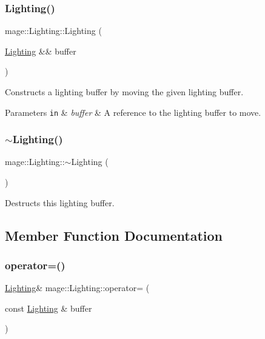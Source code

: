 \subsubsection{\texorpdfstring{Lighting()}{Lighting()}\hspace{0.1cm}{\footnotesize\ttfamily [3/3]}}
{\footnotesize\ttfamily mage\+::\+Lighting\+::\+Lighting (\begin{DoxyParamCaption}\item[{\hyperlink{structmage_1_1_lighting}{Lighting} \&\&}]{buffer }\end{DoxyParamCaption})\hspace{0.3cm}{\ttfamily [default]}}

Constructs a lighting buffer by moving the given lighting buffer.


\begin{DoxyParams}[1]{Parameters}
\mbox{\tt in}  & {\em buffer} & A reference to the lighting buffer to move. \\
\hline
\end{DoxyParams}
\hypertarget{structmage_1_1_lighting_a2b357cb6853d05bae8be16fc6d63a6c3}{}\label{structmage_1_1_lighting_a2b357cb6853d05bae8be16fc6d63a6c3} 
\subsubsection{\texorpdfstring{$\sim$\+Lighting()}{~Lighting()}}
{\footnotesize\ttfamily mage\+::\+Lighting\+::$\sim$\+Lighting (\begin{DoxyParamCaption}{ }\end{DoxyParamCaption})\hspace{0.3cm}{\ttfamily [default]}}

Destructs this lighting buffer. 

\subsection{Member Function Documentation}
\hypertarget{structmage_1_1_lighting_af3407499990673e6a6880cbcc5f5b054}{}\label{structmage_1_1_lighting_af3407499990673e6a6880cbcc5f5b054} 
\subsubsection{\texorpdfstring{operator=()}{operator=()}\hspace{0.1cm}{\footnotesize\ttfamily [1/2]}}
{\footnotesize\ttfamily \hyperlink{structmage_1_1_lighting}{Lighting}\& mage\+::\+Lighting\+::operator= (\begin{DoxyParamCaption}\item[{const \hyperlink{structmage_1_1_lighting}{Lighting} \&}]{buffer }\end{DoxyParamCaption})\hspace{0.3cm}{\ttfamily [default]}}

